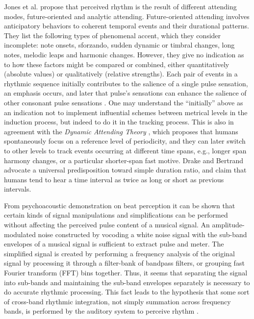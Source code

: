 \documentclass{scrartcl}
\begin{document}
Jones et al. \cite{Jones1989} propose that perceived rhythm is the result of different attending modes, future-oriented and analytic attending. Future-oriented attending involves anticipatory behaviors to coherent temporal events and their durational patterns. They list the following types of phenomenal accent, which they consider incomplete: note onsets, sforzando, sudden dynamic or timbral changes, long notes, melodic leaps and harmonic changes. However, they give no indication as to how these factors might be compared or combined, either quantitatively (absolute values) or qualitatively (relative strengths). Each pair of events in a rhythmic sequence initially contributes to the salience of a single pulse sensation, an emphasis occurs, and later that pulse's sensations can enhance the salience of other consonant pulse sensations \cite{Parncutt1994}. One may understand the ``initially'' above as an indication not to implement influential schemes between metrical levels in the induction process, but indeed to do it in the tracking process. This is also in agreement with the \emph{Dynamic Attending Theory} \cite{Jones1989}, which proposes that humans spontaneously focus on a reference level of periodicity, and they can later switch to other levels to track events occurring at different time spans, e.g., longer span harmony changes, or a particular shorter-span fast motive. Drake and Bertrand \cite{Drake2001} advocate a universal predisposition toward simple duration ratio, and claim that humans tend to hear a time interval as twice as long or short as previous intervals. 

From psychoacoustic demonstration on beat perception it can be shown that certain kinds of signal manipulations and simplifications can be performed without affecting the perceived pulse content of a musical signal. An amplitude-modulated noise constructed by vocoding a white noise signal with the sub-band envelopes of a musical signal is sufficient to extract pulse and meter. The simplified signal is created by performing a frequency analysis of the original signal by processing it through a filter-bank of bandpass filters, or grouping fast Fourier transform (FFT) bins together. Thus, it seems that separating the signal into sub-bands and maintaining the sub-band envelopes separately is necessary to do accurate rhythmic processing. This fact leads to the hypothesis that some sort of cross-band rhythmic integration, not simply summation across frequency bands, is performed by the auditory system to perceive rhythm \cite{Scheirer1998}.
\end{document}
